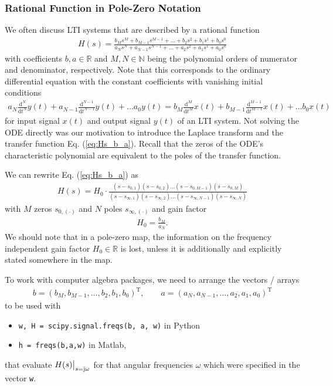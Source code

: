 \documentclass[11pt,a4paper,DIV=12]{scrartcl}
\numberwithin{equation}{section}
\numberwithin{figure}{section}
\newcommand\fsd{\mathrm{d}} %
\newcommand{\eq}[1]{Eq. (\ref{#1})} %
\begin{document}
\subsubsection{Rational Function in Pole-Zero Notation}
We often discuss LTI systems that are described by a rational function
\begin{align}
\label{eq:Hs_b_a}
H(s) = \frac
{b_M s^M + b_{M-1} s^{M-1} + \dots + b_2 s^2 + b_1 s^1 + b_0 s^0}
{a_N s^N + a_{N-1} s^{N-1} + \dots + a_2 s^2 + a_1 s^1 + a_0 s^0}
\end{align}
with coefficients $b,a \in \mathbb{R}$ and $M,N \in \mathbb{N}$ being the
polynomial orders of numerator and denominator, respectively.
%
Note that this corresponds to the ordinary differential equation with the
constant coefficients with vanishing initial conditions
\begin{align}
a_N \frac{\fsd^N}{\fsd t^N}y(t) + a_{N-1} \frac{\fsd^{N-1}}{\fsd t^{N-1}}y(t) + \dots a_0 y(t)=
b_M \frac{\fsd^M}{\fsd t^M}x(t) + b_{M-1} \frac{\fsd^{M-1}}{\fsd t^{M-1}}x(t) + \dots b_0 x(t)
\end{align}
for input signal $x(t)$ and output signal $y(t)$ of an LTI system.
%
Not solving the ODE directly was our motivation to introduce the Laplace transform
and the transfer function \eq{eq:Hs_b_a}.
Recall that the zeros of the ODE's characteristic polynomial are equivalent to
the poles of the transfer function.
%

We can rewrite \eq{eq:Hs_b_a} as
\begin{align}
\label{eq:Hs_H0_z_p}
H(s) = H_0 \cdot \frac
{(s-s_{0,1}) (s-s_{0,2}) \dots (s-s_{0,M-1}) (s-s_{0,M})}
{(s-s_{\infty,1}) (s-s_{\infty,2}) \dots (s-s_{\infty,N-1}) (s-s_{\infty,N})}
\end{align}
with $M$ zeros $s_{0,(\cdot)}$ and $N$ poles $s_{\infty,(\cdot)}$
and gain factor
\begin{align}
H_0 = \frac{b_M}{a_N}.
\end{align}
%
We should note that in a pole-zero map, the information on the frequency
independent gain factor $H_0 \in \mathbb{R}$ is lost, unless it is additionally
and explicitly stated somewhere in the map.

To work with computer algebra packages, we need to arrange the vectors / arrays
\begin{align}
b = (b_M, b_{M-1}, \dots, b_2, b_1, b_0)^\mathrm{T}, \qquad
a = (a_N, a_{N-1}, \dots, a_2, a_1, a_0)^\mathrm{T}
\end{align}
to be used with
\begin{itemize}
  \item \verb|w, H = scipy.signal.freqs(b, a, w)| in Python
  \item \verb|h = freqs(b,a,w)| in Matlab,
\end{itemize}
that evaluate $H(s)\big|_{s=\im\omega}$ for that
angular frequencies $\omega$ which were specified in the vector \verb|w|.
\end{document}
